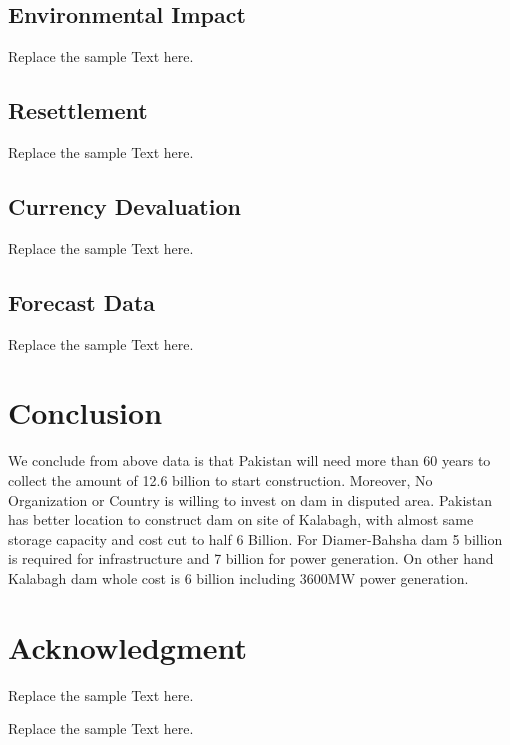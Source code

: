 \documentclass[11pt, journal,letterpaper,compsoc]{IEEEtran}
\begin{document}
\subsection{Environmental Impact}
Replace the sample Text here.

\subsection{Resettlement}
Replace the sample Text here.

\subsection{Currency Devaluation}
Replace the sample Text here.

\subsection{Forecast Data}
Replace the sample Text here.	
	
	
\section{Conclusion}
We conclude from above data is that Pakistan will need more than 60 years to collect the amount of 12.6 billion to start construction. Moreover, No Organization or Country is willing to invest on dam in disputed area. Pakistan has better location to construct dam on site of Kalabagh, with
almost same storage capacity and cost cut to half 6 Billion. For Diamer-Bahsha dam 5 billion is required for infrastructure and 7 billion for power generation. On other hand Kalabagh dam
whole cost is 6 billion including 3600MW power generation.

\section*{Acknowledgment}
Replace the sample Text here.


\begin{thebibliography}{1}

Replace the sample Text here.

\end{thebibliography}




\end{document}
